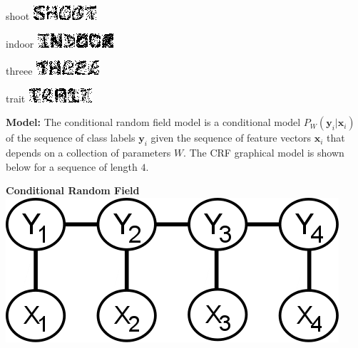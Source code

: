 \documentclass[11pt]{article}
\newcommand{\mbf}[1]{{\mathbf{#1}}}
\begin{document}
\begin{center}
  \begin{minipage}[t]{1.4in}\centering
    shoot
    \includegraphics[scale=1]{images/train_img1.png}
  \end{minipage}
  \hspace{1em}
  \begin{minipage}[t]{1.4in}\centering
    indoor
    \includegraphics[scale=1]{images/train_img2.png}
  \end{minipage}
  \hspace{1em}
  \begin{minipage}[t]{1.4in}\centering
    threee
    \includegraphics[scale=1]{images/train_img3.png}
  \end{minipage}
  \hspace{1em}
  \begin{minipage}[t]{1.4in}\centering
    trait
    \includegraphics[scale=1]{images/train_img4.png}
  \end{minipage}
\end{center}



\textbf{Model:} The conditional random field model is a conditional model $P_W(\mbf{y}_i|\mbf{x}_i)$ of the sequence of class labels $\mbf{y}_i$ given the sequence of feature vectors $\mbf{x}_i$ that depends on a collection of parameters $W$. The CRF graphical 
model is shown below for a sequence of length $4$.\\

\begin{center}
    \centering
    \textbf{Conditional Random Field}\\\vspace{10pt}
    \includegraphics[scale=0.4]{images/crf.png}
\end{center}
\end{document}
